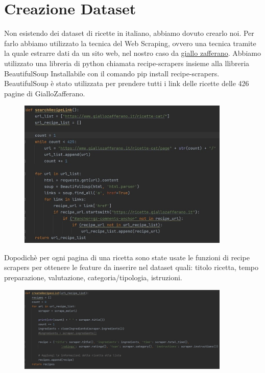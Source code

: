 \documentclass[12pt]{report}
\begin{document}
\section{Creazione Dataset}
Non esistendo dei dataset di ricette in italiano, abbiamo dovuto crearlo noi. Per farlo abbiamo utilizzato la tecnica del Web Scraping, ovvero una tecnica tramite la quale estrarre dati da un sito web, nel nostro caso da \href{https://www.giallozafferano.it/}{giallo zafferano}. 
Abbiamo utilizzato una libreria di python chiamata recipe-scrapers insieme alla llibreria BeautifulSoup
Installabile con il comando pip install recipe-scrapers.   
BeautifulSoup è stato utilizzata per prendere tutti i link delle ricette delle 426 pagine di GialloZafferano.
    \begin{figure}[H]
        \centering
        {\includegraphics[width=0.9\textwidth]{img/img1.jpg}}
    \end{figure}
Dopodichè  per ogni pagina di una ricetta sono state usate le funzioni di recipe scrapers per ottenere le feature da inserire nel dataset quali: titolo ricetta, tempo preparazione, valutazione, categoria/tipologia, istruzioni.
    \begin{figure}[H]
        \centering
        {\includegraphics[width=0.9\textwidth]{img/img2.jpg}}
    \end{figure}
\end{document}
